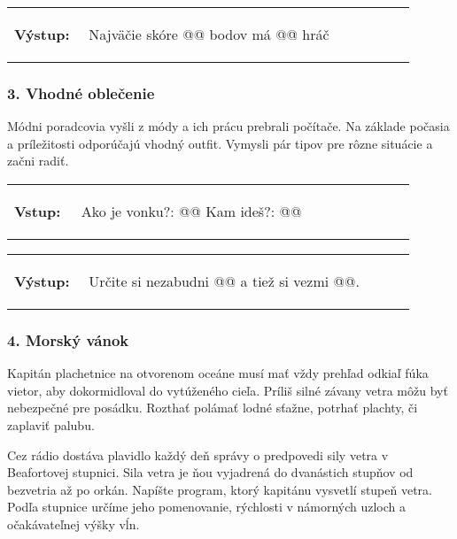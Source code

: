 \vspace{-2em}
\begin{tabular}{@{}p{0.15\linewidth}p{0.75\linewidth}}
\textbf{\small Výstup:} &
\vspace{-3em}
\begin{code}
Najväčie skóre @\fbox{\phantom{vstup}}@ bodov má @\fbox{\phantom{vstup}}@ hráč
\end{code}
\end{tabular}
\vspace{-2em}


\subsubsection*{3. Vhodné oblečenie}
Módni poradcovia vyšli z módy a ich prácu prebrali počítače. Na základe počasia a príležitosti odporúčajú vhodný outfit. Vymysli pár tipov pre rôzne situácie a začni radiť.

\begin{tabular}{@{}p{0.15\linewidth}p{0.75\linewidth}}
\textbf{\small Vstup:} &
\vspace{-3em}
\begin{code}
Ako je vonku?: @\fbox{\phantom{vstup}}@
Kam ideš?: @\fbox{\phantom{vstup}}@
\end{code}
\end{tabular}

\vspace{-2em}
\begin{tabular}{@{}p{0.15\linewidth}p{0.75\linewidth}}
\textbf{\small Výstup:} &
\vspace{-3em}
\begin{code}
Určite si nezabudni @\fbox{\phantom{vstup}}@ a tiež si vezmi @\fbox{\phantom{vstup}}@.
\end{code}
\end{tabular}
\vspace{-2em}

\subsubsection*{4. Morský vánok}
Kapitán plachetnice na otvorenom oceáne musí mať vždy prehľad odkiaľ fúka vietor, aby dokormidloval do vytúženého cieľa. Príliš silné závany vetra môžu byť nebezpečné pre posádku. Rozthať polámať lodné sťažne, potrhať plachty, či zaplaviť palubu. 

Cez rádio dostáva plavidlo každý deň správy o predpovedi sily vetra v Beafortovej stupnici. Sila vetra je ňou vyjadrená do dvanástich stupňov od bezvetria až po orkán. Napíšte program, ktorý kapitánu vysvetlí stupeň vetra. Podľa stupnice určíme jeho pomenovanie, rýchlosti v námorných uzloch a očakávateľnej výšky vĺn.

